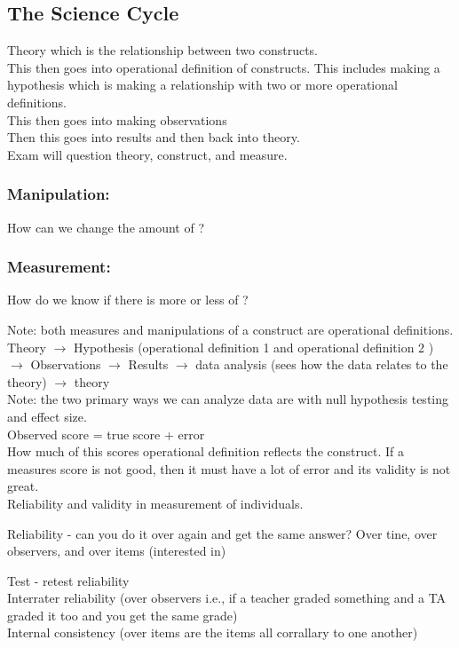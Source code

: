 \documentclass{report}
\begin{document}
\subsection{The Science Cycle}
Theory which is the relationship between two constructs. \\ 
This then goes into operational definition of constructs. This includes making a hypothesis which is making a relationship with two or more operational definitions. \\
This then goes into making observations \\ 
Then this goes into results and then back into theory. \\

Exam will question theory, construct, and measure. \\ 

\subsubsection{Manipulation:} 
How can we change the amount of ?
\subsubsection{Measurement:}
How do we know if there is more or less of ? 

Note: both measures and manipulations of a construct are operational definitions. \\ 

Theory $\rightarrow$ Hypothesis (operational definition 1 and operational definition 2 
) $\rightarrow$ Observations $\rightarrow$ Results $\rightarrow$ data analysis (sees how the data
relates to the theory) $\rightarrow$ theory \\

Note: the two primary ways we can analyze data are with 
null hypothesis testing and effect size. \\ 

Observed score = true score + error \\ 
How much of this scores operational definition reflects the construct. If a measures 
score is not good, then it must have a lot of error and its validity is not great. \\
Reliability and validity in measurement of individuals.

Reliability - can you do it over again and get the same answer? Over tine, over observers, and over items (interested in) 

Test - retest reliability \\ 
Interrater reliability (over observers i.e., if a teacher graded something and a TA graded it too and you get the same grade) \\ 
Internal consistency (over items are the items all corrallary to one another) \\ 
\end{document}
